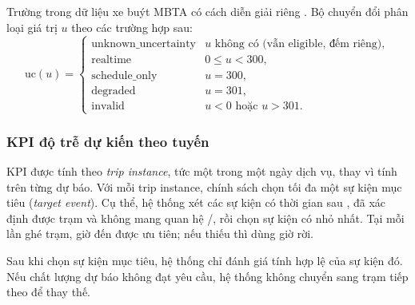 Trường  trong dữ liệu xe buýt MBTA có cách diễn giải riêng \cite{mbta_gtfs}. Bộ chuyển đổi  phân loại giá trị $u$ theo các trường hợp sau:
\begin{equation}
\text{uc}(u) =
\begin{cases}
\text{unknown\_uncertainty} & u \text{ không có (vẫn eligible, đếm riêng)},\\
\text{realtime} & 0 \le u < 300,\\
\text{schedule\_only} & u = 300,\\
\text{degraded} & u = 301,\\
\text{invalid} & u < 0 \text{ hoặc } u > 301.
\end{cases}
\end{equation}

\subsubsection{KPI độ trễ dự kiến theo tuyến}

KPI được tính theo \textit{trip instance}, tức một  trong một ngày dịch vụ, thay vì tính trên từng dự báo. Với mỗi trip instance, chính sách  chọn tối đa một sự kiện mục tiêu (\textit{target event}). Cụ thể, hệ thống xét các sự kiện có thời gian sau , đã xác định được trạm và không mang quan hệ /, rồi chọn sự kiện có  nhỏ nhất. Tại mỗi lần ghé trạm, giờ đến được ưu tiên; nếu thiếu thì dùng giờ rời.

Sau khi chọn sự kiện mục tiêu, hệ thống chỉ đánh giá tính hợp lệ của sự kiện đó. Nếu chất lượng dự báo không đạt yêu cầu, hệ thống không chuyển sang trạm tiếp theo để thay thế.

